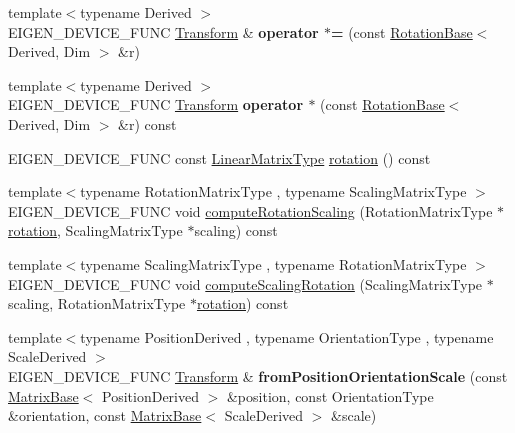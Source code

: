 \begin{DoxyCompactItemize}
\item 
\mbox{\label{class_eigen_1_1_transform_acea8e6664c0666251b7f00c8f37a65eb}} 
{\footnotesize template$<$typename Derived $>$ }\\E\+I\+G\+E\+N\+\_\+\+D\+E\+V\+I\+C\+E\+\_\+\+F\+U\+NC \mbox{\hyperlink{class_eigen_1_1_transform}{Transform}} \& {\bfseries operator $\ast$=} (const \mbox{\hyperlink{class_eigen_1_1_rotation_base}{Rotation\+Base}}$<$ Derived, Dim $>$ \&r)
\item 
\mbox{\label{class_eigen_1_1_transform_a106dec9e1708af6e1a41394fc0c05d4a}} 
{\footnotesize template$<$typename Derived $>$ }\\E\+I\+G\+E\+N\+\_\+\+D\+E\+V\+I\+C\+E\+\_\+\+F\+U\+NC \mbox{\hyperlink{class_eigen_1_1_transform}{Transform}} {\bfseries operator $\ast$} (const \mbox{\hyperlink{class_eigen_1_1_rotation_base}{Rotation\+Base}}$<$ Derived, Dim $>$ \&r) const
\item 
E\+I\+G\+E\+N\+\_\+\+D\+E\+V\+I\+C\+E\+\_\+\+F\+U\+NC const \mbox{\hyperlink{class_eigen_1_1_transform_a48138c0370e55371b95946c90d69e25c}{Linear\+Matrix\+Type}} \mbox{\hyperlink{class_eigen_1_1_transform_a87eb429e076e2c15a1bfbe99b43ae07c}{rotation}} () const
\item 
{\footnotesize template$<$typename Rotation\+Matrix\+Type , typename Scaling\+Matrix\+Type $>$ }\\E\+I\+G\+E\+N\+\_\+\+D\+E\+V\+I\+C\+E\+\_\+\+F\+U\+NC void \mbox{\hyperlink{class_eigen_1_1_transform_aff2a75622ed0a24dbe4bd22e5aeccb78}{compute\+Rotation\+Scaling}} (Rotation\+Matrix\+Type $\ast$\mbox{\hyperlink{class_eigen_1_1_transform_a87eb429e076e2c15a1bfbe99b43ae07c}{rotation}}, Scaling\+Matrix\+Type $\ast$scaling) const
\item 
{\footnotesize template$<$typename Scaling\+Matrix\+Type , typename Rotation\+Matrix\+Type $>$ }\\E\+I\+G\+E\+N\+\_\+\+D\+E\+V\+I\+C\+E\+\_\+\+F\+U\+NC void \mbox{\hyperlink{class_eigen_1_1_transform_a88f214d6340a4ced22d673d54661e16c}{compute\+Scaling\+Rotation}} (Scaling\+Matrix\+Type $\ast$scaling, Rotation\+Matrix\+Type $\ast$\mbox{\hyperlink{class_eigen_1_1_transform_a87eb429e076e2c15a1bfbe99b43ae07c}{rotation}}) const
\item 
\mbox{\label{class_eigen_1_1_transform_a5cb9c995eef95a03bd19a9a56b620a33}} 
{\footnotesize template$<$typename Position\+Derived , typename Orientation\+Type , typename Scale\+Derived $>$ }\\E\+I\+G\+E\+N\+\_\+\+D\+E\+V\+I\+C\+E\+\_\+\+F\+U\+NC \mbox{\hyperlink{class_eigen_1_1_transform}{Transform}} \& {\bfseries from\+Position\+Orientation\+Scale} (const \mbox{\hyperlink{class_eigen_1_1_matrix_base}{Matrix\+Base}}$<$ Position\+Derived $>$ \&position, const Orientation\+Type \&orientation, const \mbox{\hyperlink{class_eigen_1_1_matrix_base}{Matrix\+Base}}$<$ Scale\+Derived $>$ \&scale)

\end{DoxyCompactItemize}
